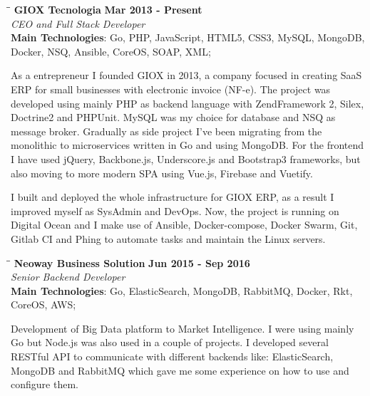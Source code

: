 \documentclass[margin]{res}
\begin{document}
\begin{resume}
\vspace{-0.1in}
    \begin{tabbing}
    \hspace{2.3in}\= \hspace{1.7in}\= \kill
    \textbf{GIOX Tecnologia}    \>\>\textbf{Mar 2013 - Present}\\
    \textit{CEO and Full Stack Developer}\\
    \textbf{Main Technologies}: Go, PHP, JavaScript, HTML5, CSS3, MySQL, MongoDB, \\Docker, NSQ, Ansible, CoreOS, SOAP, XML;
    \end{tabbing}\vspace{-20pt}
    \vspace{2mm}
As a entrepreneur I founded GIOX in 2013, a company focused in creating SaaS ERP for small businesses with electronic invoice (NF-e). The project was developed using mainly PHP as backend language with ZendFramework 2, Silex, Doctrine2 and PHPUnit. MySQL was my choice for database and NSQ as message broker. Gradually as side project I've been migrating from the monolithic to microservices written in Go and using MongoDB. For the frontend I have used jQuery, Backbone.js, Underscore.js and Bootstrap3 frameworks, but also moving to more modern SPA using Vue.js, Firebase and Vuetify.

I built and deployed the whole infrastructure for GIOX ERP, as a result I improved myself as SysAdmin and DevOps. Now, the project is running on Digital Ocean and I make use of Ansible, Docker-compose, Docker Swarm, Git, Gitlab CI and Phing to automate tasks and maintain the Linux servers.

\vspace{-0.1in}
    \begin{tabbing}
    \hspace{2.3in}\= \hspace{1.7in}\= \kill %
    \textbf{Neoway Business Solution}    \>\>\textbf{Jun 2015 - Sep 2016}\\
    \textit{Senior Backend Developer}\\
    \textbf{Main Technologies}: Go, ElasticSearch, MongoDB, RabbitMQ, Docker, Rkt,\\CoreOS, AWS;
    \end{tabbing}\vspace{-20pt}      %
    \vspace{2mm}
Development of Big Data platform to Market Intelligence. I were using mainly Go but Node.js was also used in a couple of projects. I developed several RESTful API to communicate with different backends like: ElasticSearch, MongoDB and RabbitMQ which gave me some experience on how to use and configure them.


\end{resume}
\end{document}
